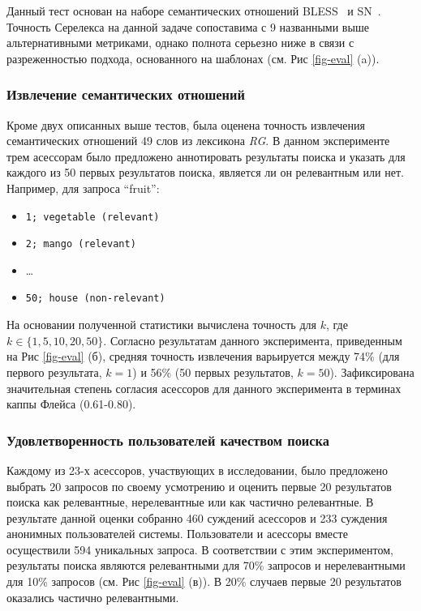 \documentclass[a4paper,10pt,twoside]{article}
\begin{document}
Данный тест основан на наборе семантических отношений BLESS~\cite{baroniwe} и SN~\cite{panchenko2012study}. Точность Серелекса на данной задаче сопоставима с 9 названными выше альтернативными метриками, однако полнота серьезно ниже в связи с разреженностью подхода, основанного на шаблонах (см. Рис \ref{fig-eval} (a)).

\subsubsection{Извлечение семантических отношений} 

Кроме двух описанных выше тестов, была оценена точность извлечения семантических отношений 49 слов из лексикона \textit{RG}. В данном эксперименте трем асессорам было предложено аннотировать результаты поиска и указать для каждого из 50 первых результатов поиска, является ли он релевантным или нет. Например, для запроса ``fruit'':

\begin{itemize}
  \footnotesize
  \item \texttt{1; vegetable (relevant)}
  \item \texttt{2; mango (relevant)}
  \item \ldots
  \item \texttt{50; house (non-relevant)}
\end{itemize} 

На основании полученной статистики вычислена точность для $k$, где $k \in \{1, 5, 10, 20, 50\}$. Согласно результатам данного эксперимента, приведенным на Рис \ref{fig-eval} (б), средняя точность извлечения варьируется между 74\% (для первого результата, $k=1$) и 56\% (50 первых результатов, $k=50$). Зафиксирована значительная степень согласия асессоров для данного эксперимента в терминах каппы Флейса (0.61-0.80).


\subsubsection{Удовлетворенность пользователей качеством поиска} Каждому из 23-х асессоров, участвующих в исследовании, было предложено выбрать 20 запросов по своему усмотрению и оценить первые 20 результатов поиска как релевантные, нерелевантные или как частично релевантные. В результате данной оценки собранно 460 суждений асессоров и 233 суждения анонимных пользователей системы. Пользователи и асессоры вместе осуществили 594 уникальных запроса. В соответствии с этим экспериментом, результаты поиска являются релевантными для 70\% запросов и нерелевантными для 10\% запросов (см. Рис \ref{fig-eval} (в)). В 20\% случаев первые 20 результатов оказались частично релевантными.
\end{document}
